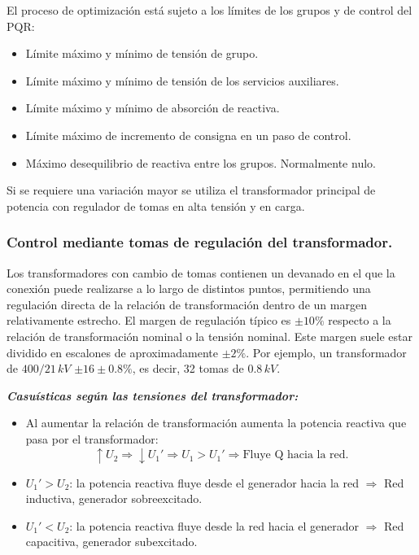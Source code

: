 				
					El proceso de optimización está sujeto a los límites de los grupos y de control del PQR:
					\begin{itemize}
						\item Límite máximo y mínimo de tensión de grupo.
						\item Límite máximo y mínimo de tensión de los servicios auxiliares.
						\item Límite máximo y mínimo de absorción de reactiva.
						\item Límite máximo de incremento de consigna en un paso de control.
						\item Máximo desequilibrio de reactiva entre los grupos. Normalmente nulo.
					\end{itemize}
					Si se requiere una variación mayor se utiliza el transformador principal de potencia con regulador de tomas en alta tensión y en carga.
					
			\subsubsection{Control mediante tomas de regulación del transformador.}
				Los transformadores con cambio de tomas contienen un devanado en el que la conexión puede realizarse a lo largo de distintos puntos, permitiendo una regulación directa de la relación de transformación dentro de un margen relativamente estrecho. El margen de regulación típico es $\pm10\%$ respecto a la relación de transformación nominal o la tensión nominal. Este margen suele estar dividido en escalones de aproximadamente $\pm2\%$. Por ejemplo, un transformador de $400/21\,kV$ $\pm 16 \pm 0.8\%$, es decir, 32 tomas de $0.8\,kV$.
				
				\vspace{0.25cm}
				\textbf{\textit{Casuísticas según las tensiones del transformador:}}
				\begin{itemize}
					\item Al aumentar la relación de transformación aumenta la potencia reactiva que pasa por el transformador:
					\[\uparrow U_2 \Rightarrow \downarrow U_1' \Rightarrow U_1 > U_1' \Rightarrow \text{Fluye Q hacia la red.}\]
					\item $U_1' > U_2$: la potencia reactiva fluye desde el generador hacia la red $\Rightarrow$ Red inductiva, generador sobreexcitado.
					\item $U_1' < U_2$: la potencia reactiva fluye desde la red hacia el generador $\Rightarrow$ Red capacitiva, generador subexcitado.
				\end{itemize}
				
